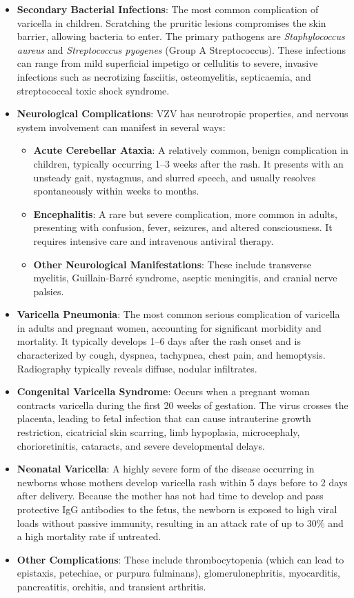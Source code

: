 \begin{itemize}
    \item \textbf{Secondary Bacterial Infections}: The most common complication of varicella in children. Scratching the pruritic lesions compromises the skin barrier, allowing bacteria to enter. The primary pathogens are \textit{Staphylococcus aureus} and \textit{Streptococcus pyogenes} (Group A Streptococcus). These infections can range from mild superficial impetigo or cellulitis to severe, invasive infections such as necrotizing fasciitis, osteomyelitis, septicaemia, and streptococcal toxic shock syndrome.
    \item \textbf{Neurological Complications}: VZV has neurotropic properties, and nervous system involvement can manifest in several ways:
    \begin{itemize}
        \item \textbf{Acute Cerebellar Ataxia}: A relatively common, benign complication in children, typically occurring 1--3 weeks after the rash. It presents with an unsteady gait, nystagmus, and slurred speech, and usually resolves spontaneously within weeks to months.
        \item \textbf{Encephalitis}: A rare but severe complication, more common in adults, presenting with confusion, fever, seizures, and altered consciousness. It requires intensive care and intravenous antiviral therapy.
        \item \textbf{Other Neurological Manifestations}: These include transverse myelitis, Guillain-Barré syndrome, aseptic meningitis, and cranial nerve palsies.
    \end{itemize}
    \item \textbf{Varicella Pneumonia}: The most common serious complication of varicella in adults and pregnant women, accounting for significant morbidity and mortality. It typically develops 1--6 days after the rash onset and is characterized by cough, dyspnea, tachypnea, chest pain, and hemoptysis. Radiography typically reveals diffuse, nodular infiltrates.
    \item \textbf{Congenital Varicella Syndrome}: Occurs when a pregnant woman contracts varicella during the first 20 weeks of gestation. The virus crosses the placenta, leading to fetal infection that can cause intrauterine growth restriction, cicatricial skin scarring, limb hypoplasia, microcephaly, chorioretinitis, cataracts, and severe developmental delays.
    \item \textbf{Neonatal Varicella}: A highly severe form of the disease occurring in newborns whose mothers develop varicella rash within 5 days before to 2 days after delivery. Because the mother has not had time to develop and pass protective IgG antibodies to the fetus, the newborn is exposed to high viral loads without passive immunity, resulting in an attack rate of up to 30\% and a high mortality rate if untreated.
    \item \textbf{Other Complications}: These include thrombocytopenia (which can lead to epistaxis, petechiae, or purpura fulminans), glomerulonephritis, myocarditis, pancreatitis, orchitis, and transient arthritis.
\end{itemize}

